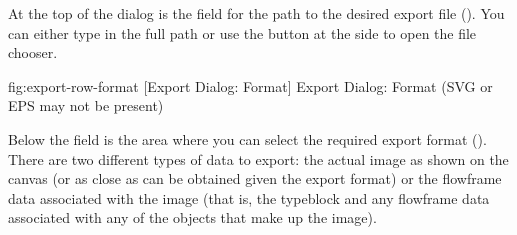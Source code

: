 At the top of the  dialog is the
 field for the path to the desired export
file (). You can either type in the
full path or use the  button at the side to open
the file chooser.


\FloatFig
 {fig:export-row-format}
 {}
 [Export Dialog: Format]
 {Export Dialog: Format (SVG or EPS may not be present)}

Below the  field is the  area where you
can select the required export format ().
There are two different types of data to export: the actual image as
shown on the \gls{canvas} (or as close as can be obtained given the
export format) or the \gls{flowframe} data associated with the
image (that is, the \gls{typeblock} and any \gls{flowframe} data
associated with any of the \glspl{object} that make up the image).


